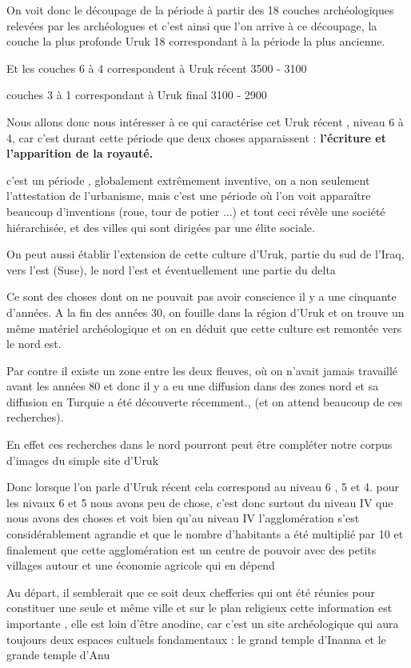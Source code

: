 \documentclass[a4paper,10pt]{article}
\begin{document}
On voit donc le découpage de la période à partir des 18 couches
archéologiques relevées par les archéologues et c'est 
ainsi que l'on arrive à ce découpage, la couche la
plus profonde  Uruk 18 correspondant à la période la plus ancienne.

Et les couches 6 à 4 correspondent à Uruk récent  3500 - 3100

couches 3 à 1 correspondant à Uruk final 3100 - 2900 

Nous allons donc nous intéresser à ce qui caractérise cet Uruk récent ,
niveau 6 à 4, car c'est durant cette période que deux
choses apparaissent :  \textbf{l'écriture et
l'apparition de la royauté.}

c'est un période , globalement extrêmement inventive,
on a non seulement l'attestation de
l'urbanisme, mais c'est une période
où l'on voit apparaître beaucoup
d'inventions (roue, tour de potier ...) et tout ceci
révèle une société hiérarchisée, et des villes qui sont dirigées par
une élite sociale.

On peut aussi établir l'extension de cette culture
d'Uruk, partie du sud de l'Iraq, vers
l'est (Suse), le nord l'est et
éventuellement une partie du delta

Ce sont des choses dont on ne pouvait pas avoir conscience il y a une
cinquante d'années. A la fin des années 30, on fouille
dans la région d'Uruk et on trouve un même matériel
archéologique et on en déduit que cette culture est remontée vers le
nord est. 

Par contre il existe un zone entre les deux fleuves, où on
n'avait jamais travaillé avant les années 80 et donc
il y a eu une diffusion dans des zones nord et sa diffusion en Turquie
a été découverte récemment., (et on attend beaucoup de ces recherches).

En effet ces recherches dans le nord pourront peut être compléter notre
corpus d'images du simple site d'Uruk

Donc lorsque l'on parle d'Uruk récent
cela correspond au niveau 6 , 5 et 4. pour les nivaux 6 et 5 nous avons
peu de chose, c'est donc surtout du niveau IV que nous
avons des choses et voit bien qu'au niveau IV
l'agglomération s'est
considérablement agrandie et que le nombre d'habitants
a été multiplié par 10 et finalement que cette agglomération est un
centre de pouvoir avec des petits villages autour et une économie
agricole qui en dépend

Au départ, il semblerait que ce soit deux chefferies qui ont été réunies
pour constituer une seule et même ville et sur le plan religieux cette
information est importante , elle est loin d'être
anodine, car c'est un site archéologique qui aura
toujours deux espaces cultuels fondamentaux : le grand temple
d'Inanna  et le grande temple d'Anu
\end{document}
